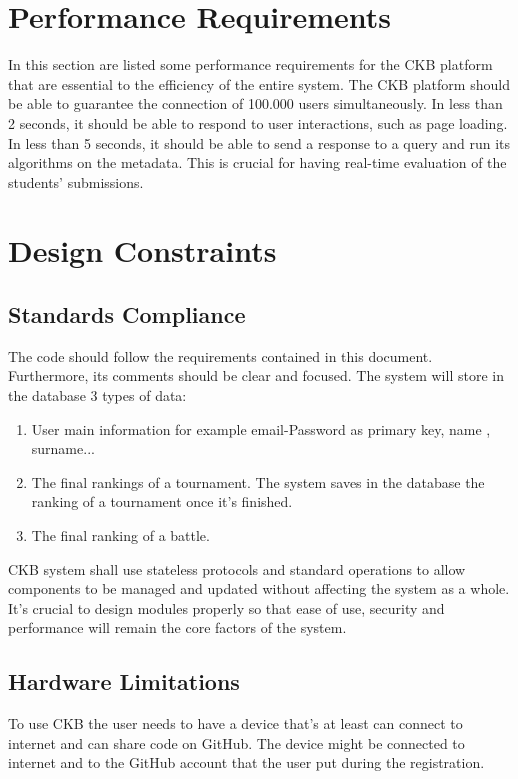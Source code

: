 \clearpage
\section{Performance Requirements}
In this section are listed some performance requirements for the CKB platform that are essential to the efficiency of the entire system.
The CKB platform should be able to guarantee the connection of 100.000 users simultaneously. \newline 
In less than 2 seconds, it should be able to respond to user interactions, such as page loading. \newline
In less than 5 seconds, it should be able to send a response to a query and run its algorithms on the metadata. This is crucial for having real-time evaluation of the students' submissions.

\section{Design Constraints}
\subsection{Standards Compliance}
The code should follow the requirements contained in this document. Furthermore, its comments should
be clear and focused.
The system will store in the database 3 types of data:
\begin{enumerate}
    \item User main information for example email-Password as primary key, name , surname...
    \item The final rankings of a tournament. The system saves in the database the ranking of a tournament once it's finished.
    \item The final ranking of a battle.
\end{enumerate}

CKB system shall use stateless protocols and standard operations to allow components to
be managed and updated without affecting the system as a whole.
It’s crucial to design modules properly so that ease of use, security and performance will
remain the core factors of the system.
\subsection{Hardware Limitations}
To use CKB the user needs to have a device that's at least can connect to internet and can share code on GitHub.
The device might be connected to internet and to the GitHub account that the user put during the registration. 

